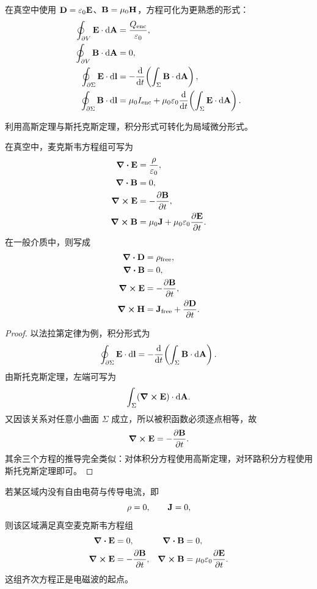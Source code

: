 在真空中使用 $\vb{D}=\varepsilon_0\vb{E}$、$\vb{B}=\mu_0\vb{H}$，方程可化为更熟悉的形式：
\begin{align*}
\oint_{\partial V} \vb{E}\cdot \dd \vb{A} &= \frac{Q_{\text{enc}}}{\varepsilon_0}, \\
\oint_{\partial V} \vb{B}\cdot \dd \vb{A} &= 0, \\
\oint_{\partial \Sigma} \vb{E}\cdot \dd \vb{l} &= -\dv{}{t}\!\left(\int_{\Sigma}\vb{B}\cdot \dd \vb{A}\right), \\
\oint_{\partial \Sigma} \vb{B}\cdot \dd \vb{l} &= \mu_0 I_{\text{enc}}+\mu_0\varepsilon_0\dv{}{t}\!\left(\int_{\Sigma}\vb{E}\cdot \dd \vb{A}\right).
\end{align*}

利用高斯定理与斯托克斯定理，积分形式可转化为局域微分形式。

\begin{theorem}[麦克斯韦方程组的微分形式]
在真空中，麦克斯韦方程组可写为
\begin{align*}
\div \vb{E} &= \frac{\rho}{\varepsilon_0}, \\
\div \vb{B} &= 0, \\
\curl \vb{E} &= -\pdv{\vb{B}}{t}, \\
\curl \vb{B} &= \mu_0\vb{J}+\mu_0\varepsilon_0\pdv{\vb{E}}{t}.
\end{align*}
在一般介质中，则写成
\begin{align*}
\div \vb{D} &= \rho_{\text{free}}, \\
\div \vb{B} &= 0, \\
\curl \vb{E} &= -\pdv{\vb{B}}{t}, \\
\curl \vb{H} &= \vb{J}_{\text{free}}+\pdv{\vb{D}}{t}.
\end{align*}
\end{theorem}

\begin{proof}
以法拉第定律为例，积分形式为
\[
\oint_{\partial \Sigma}\vb{E}\cdot \dd\vb{l}=-\dv{}{t}\!\left(\int_\Sigma \vb{B}\cdot \dd\vb{A}\right).
\]
由斯托克斯定理，左端可写为
\[
\int_\Sigma (\curl \vb{E})\cdot \dd\vb{A}.
\]
又因该关系对任意小曲面 $\Sigma$ 成立，所以被积函数必须逐点相等，故
\[
\curl \vb{E}=-\pdv{\vb{B}}{t}.
\]
其余三个方程的推导完全类似：对体积分方程使用高斯定理，对环路积分方程使用斯托克斯定理即可。
\end{proof}

\begin{definition}[真空中的电磁场]
若某区域内没有自由电荷与传导电流，即
\[
\rho=0,\qquad \vb{J}=0,
\]
则该区域满足真空麦克斯韦方程组
\begin{align*}
\div \vb{E} &= 0, & \div \vb{B} &= 0,\\
\curl \vb{E} &= -\pdv{\vb{B}}{t}, & \curl \vb{B} &= \mu_0\varepsilon_0\pdv{\vb{E}}{t}.
\end{align*}
这组齐次方程正是电磁波的起点。
\end{definition}

